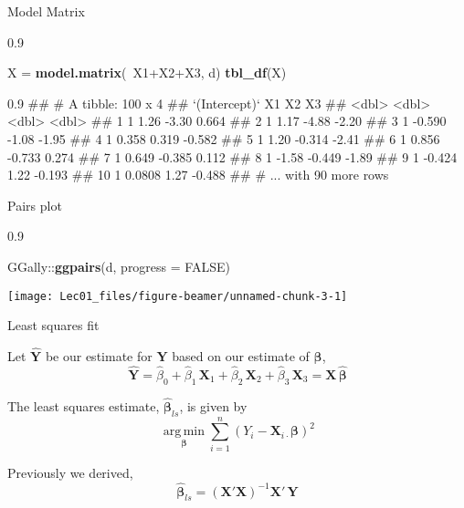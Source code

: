 \documentclass[11pt,ignorenonframetext,]{beamer}
\newenvironment{Shaded}{}{}
\newcommand{\DataTypeTok}[1]{\textcolor[rgb]{0.56,0.13,0.00}{#1}}
\newcommand{\KeywordTok}[1]{\textcolor[rgb]{0.00,0.44,0.13}{\textbf{#1}}}
\newcommand{\NormalTok}[1]{#1}
\newcommand{\OperatorTok}[1]{\textcolor[rgb]{0.40,0.40,0.40}{#1}}
\newcommand{\OtherTok}[1]{\textcolor[rgb]{0.00,0.44,0.13}{#1}}
\newcommand{\StringTok}[1]{\textcolor[rgb]{0.25,0.44,0.63}{#1}}
\let\oldShaded\Shaded
\let\endoldShaded\endShaded
\renewenvironment{Shaded}{\footnotesize\begin{spacing}{0.9}\oldShaded}{\endoldShaded\end{spacing}}
\let\oldverbatim\verbatim
\let\endoldverbatim\endverbatim
\renewenvironment{verbatim}{\footnotesize\begin{spacing}{0.9}\oldverbatim}{\endoldverbatim\end{spacing}}
\DeclareMathOperator*{\argmin}{arg\,min}
\begin{document}
\begin{frame}[fragile,t]{Model Matrix}
\protect\hypertarget{model-matrix}{}

\begin{Shaded}
\begin{Highlighting}[]
\NormalTok{X =}\StringTok{ }\KeywordTok{model.matrix}\NormalTok{(}\OperatorTok{~}\NormalTok{X1}\OperatorTok{+}\NormalTok{X2}\OperatorTok{+}\NormalTok{X3, d) }
\KeywordTok{tbl_df}\NormalTok{(X)}
\end{Highlighting}
\end{Shaded}

\begin{verbatim}
## # A tibble: 100 x 4
##    `(Intercept)`      X1     X2     X3
##            <dbl>   <dbl>  <dbl>  <dbl>
##  1             1  1.26   -3.30   0.664
##  2             1  1.17   -4.88  -2.20 
##  3             1 -0.590  -1.08  -1.95 
##  4             1  0.358   0.319 -0.582
##  5             1  1.20   -0.314 -2.41 
##  6             1  0.856  -0.733  0.274
##  7             1  0.649  -0.385  0.112
##  8             1 -1.58   -0.449 -1.89 
##  9             1 -0.424   1.22  -0.193
## 10             1  0.0808  1.27  -0.488
## # ... with 90 more rows
\end{verbatim}

\end{frame}

\begin{frame}[fragile,t]{Pairs plot}
\protect\hypertarget{pairs-plot}{}

\begin{Shaded}
\begin{Highlighting}[]
\NormalTok{GGally}\OperatorTok{::}\KeywordTok{ggpairs}\NormalTok{(d, }\DataTypeTok{progress =} \OtherTok{FALSE}\NormalTok{)}
\end{Highlighting}
\end{Shaded}

\begin{center}\texttt{[image: Lec01\_files/figure-beamer/unnamed-chunk-3-1]} \end{center}

\end{frame}

\begin{frame}[t]{Least squares fit}
\protect\hypertarget{least-squares-fit}{}

Let \(\hat{\symbf{Y}}\) be our estimate for \(\symbf{Y}\) based on our
estimate of \(\symbf{\beta}\),
\[ \hat{\symbf{Y}} = \hat{\beta}_0 + \hat{\beta}_1 \, \symbf{X}_{1} + \hat{\beta}_2 \, \symbf{X}_{2} + \hat{\beta}_3 \, \symbf{X}_{3} = \symbf{X}\, \hat{\symbf{\beta}} \]

\pause

The least squares estimate, \(\hat{\symbf{\beta}}_{ls}\), is given by
\[ \underset{\symbf{\beta}}{\argmin} \sum_{i=1}^n \left( Y_i - \symbf{X}_{i\cdot} \symbf{\beta} \right)^2 \]

\pause

Previously we derived,
\[ \hat{\symbf{\beta}}_{ls} = (\symbf{X}' \symbf{X})^{-1} \symbf{X}' \, \symbf{Y} \]

\end{frame}
\end{document}
